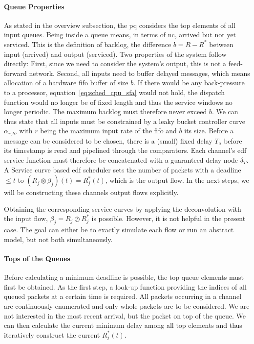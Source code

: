 \paragraph{Queue Properties}
As stated in the overview subsection, the \gls{pq} considers the top elements of all input queues. Being inside a queue means, in terms of \gls{nc}, arrived but not yet serviced. This is the definition of backlog,
the difference $b = R - R^*$ between input (arrived) and output (serviced). Two properties of the system follow directly: First, since we need to consider the system's output, this is not a feed-forward network.
Second, all inputs need to buffer delayed messages, which means allocation of a hardware \gls{fifo} buffer of size $b$.
If there would be any back-pressure to a processor, equation~\ref{eq:sched_cpu_sfa} would not hold, the dispatch function would no longer be of fixed length and thus the service windows no longer periodic.
The maximum backlog must therefore never exceed $b$. We can thus state that all inputs must be constrained by a leaky bucket controller curve $\alpha_{r,b}$, with $r$ being the maximum input rate of the \gls{fifo} and $b$ its size.
Before a message can be considered to be chosen, there is a (small) fixed delay $T_a$ before its timestamp is read and pipelined through the comparators.
Each channel's \gls{edf} service function must therefore be concatenated with a guaranteed delay node $\delta_{T}$.
A Service curve based \gls{edf} scheduler sets the number of packets with a deadline $\le t$ to $(R_j \otimes \beta_j)(t) = R_j^*(t)$,
which is the output flow. In the next steps, we will be constructing these channels output flows explicitly. 
\par
Obtaining the corresponding service curves by applying the
deconvolution with the input flow, $\beta_j = R_j \oslash R_j^*$ is possible. However, it is not helpful in the present case. The goal can either be to exactly simulate each flow or run an abstract model, but not both simultaneously.

\paragraph{Tops of the Queues}
Before calculating a minimum deadline is possible, the top queue elements must first be obtained.
As the first step, a look-up function providing the indices of all queued packets at a certain time is required.
All packets occurring in a channel are continuously enumerated and only whole packets are to be considered.
We are not interested in the most recent arrival, but the packet on top of the queue. 
We can then calculate the current minimum delay among all top elements and thus iteratively construct the current $R^*_j(t)$.

